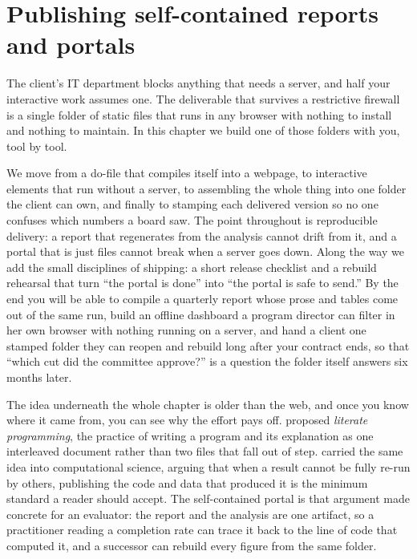 \chapter{Publishing self-contained reports and portals}\label{ch:portals}

The client's IT department blocks anything that needs a server, and half your interactive work assumes one. The deliverable that survives a restrictive firewall is a single folder of static files that runs in any browser with nothing to install and nothing to maintain. In this chapter we build one of those folders with you, tool by tool.

We move from a do-file that compiles itself into a webpage, to interactive elements that run without a server, to assembling the whole thing into one folder the client can own, and finally to stamping each delivered version so no one confuses which numbers a board saw. The point throughout is reproducible delivery: a report that regenerates from the analysis cannot drift from it, and a portal that is just files cannot break when a server goes down. Along the way we add the small disciplines of shipping: a short release checklist and a rebuild rehearsal that turn \enquote{the portal is done} into \enquote{the portal is safe to send.} By the end you will be able to compile a quarterly report whose prose and tables come out of the same run, build an offline dashboard a program director can filter in her own browser with nothing running on a server, and hand a client one stamped folder they can reopen and rebuild long after your contract ends, so that \enquote{which cut did the committee approve?} is a question the folder itself answers six months later.

The idea underneath the whole chapter is older than the web, and once you know where it came from, you can see why the effort pays off. \textcite{knuth1984literate} proposed \emph{literate programming}, the practice of writing a program and its explanation as one interleaved document rather than two files that fall out of step. \textcite{peng2011reproducible} carried the same idea into computational science, arguing that when a result cannot be fully re-run by others, publishing the code and data that produced it is the minimum standard a reader should accept. The self-contained portal is that argument made concrete for an evaluator: the report and the analysis are one artifact, so a practitioner reading a completion rate can trace it back to the line of code that computed it, and a successor can rebuild every figure from the same folder.

